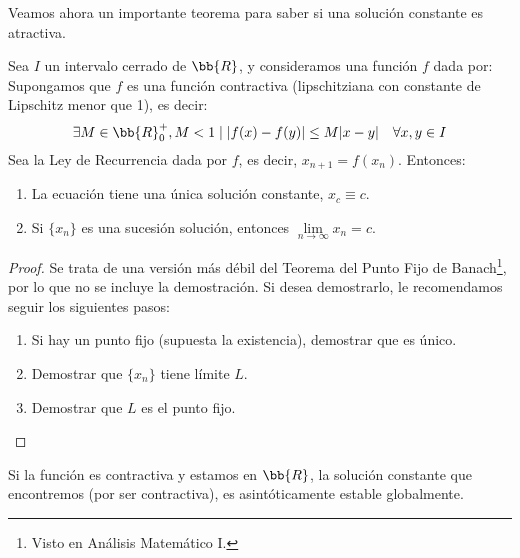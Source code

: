 Veamos ahora un importante teorema para saber si una solución constante es atractiva.
\begin{teo}
Sea $I$ un intervalo cerrado de $\bb{R}$, y consideramos una función $f$ dada por:
   Supongamos que $f$ es una función contractiva (lipschitziana con constante de Lipschitz menor que 1), es decir:
    \begin{equation*}
        \exists M \in \bb{R}^+_0, M < 1 \mid |f(x)-f(y)|\leq M|x-y|\quad \forall x,y \in I
    \end{equation*}
    Sea la Ley de Recurrencia dada por $f$, es decir, $x_{n+1} = f(x_n)$. Entonces:
    \begin{enumerate}
        \item La ecuación tiene una única solución constante, $x_c \equiv c$.
        \item Si $\{x_n\}$ es una sucesión solución, entonces $\lim\limits_{n \to \infty}x_n = c$.
    \end{enumerate}
\end{teo}
\begin{proof}
    Se trata de una versión más débil del Teorema del Punto Fijo de Banach\footnote{Visto en Análisis Matemático I.}, por lo que no se incluye la demostración. Si desea demostrarlo, le recomendamos seguir los siguientes pasos:
    \begin{enumerate}
        \item Si hay un punto fijo (supuesta la existencia), demostrar que es único.
        \item Demostrar que $\{x_n\}$ tiene límite $L$.
        \item Demostrar que $L$ es el punto fijo.
    \end{enumerate}
\end{proof}

\begin{prop}
    Si la función es contractiva y estamos en $\bb{R}$, la solución constante que encontremos (por ser contractiva), es asintóticamente estable globalmente.
\end{prop}

